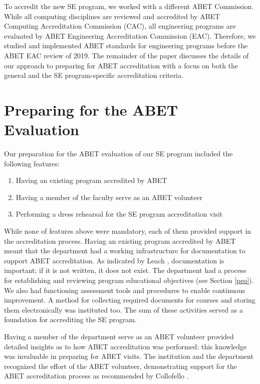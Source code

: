 \documentclass{article}
\begin{document}
To accredit the new SE program, we worked with a different ABET Commission.  While all computing disciplines are reviewed and accredited by ABET Computing Accreditation Commission (CAC), all engineering programs are evaluated by ABET Engineering Accreditation Commission (EAC).  Therefore, we studied and implemented ABET standards for engineering programs before the ABET EAC review of 2019.  The remainder of the paper discusses the details of our approach to preparing for ABET accreditation with a focus on both the general and the SE program-specific accreditation criteria.  

\section{Preparing for the ABET Evaluation}
Our preparation for the ABET evaluation of our SE program included the following features:
\begin{enumerate}[noitemsep]
  \item Having an existing program accredited by ABET
  \item Having a member of the faculty serve as an ABET volunteer
  \item Performing a dress rehearsal for the SE program accreditation visit
\end{enumerate}

While none of features above were mandatory, each of them provided support in the accreditation process.  Having an existing program accredited by ABET meant that the department had a working infrastructure for documentation to support ABET accreditation.  As indicated by Leach \cite{leach10}, documentation is important; if it is not written, it does not exist. The department had a process for establishing and reviewing program educational objectives (see Section \ref{peo}).  We also had functioning assessment tools and procedures to enable continuous improvement.  A method for collecting required documents for courses and storing them electronically was instituted too. The sum of these activities served as a foundation for accrediting the SE program.  
        
Having a member of the department serve as an ABET volunteer provided detailed insights as to how ABET accreditation was performed: this knowledge was invaluable in preparing for ABET visits.  The institution and the department recognized the effort of the ABET volunteer, demonstrating support for the ABET accreditation process as recommended by Collofello \cite{collofello04}.
        
\end{document}
